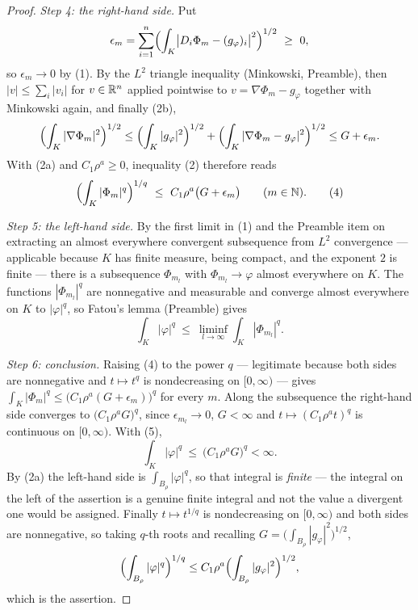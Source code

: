 \begin{proof}
\emph{Step 4: the right-hand side.}  Put
\[
\epsilon_m=\sum_{i=1}^n
\Bigl(\int_K\bigl|D_i\Phi_m-(g_\varphi)_i\bigr|^{2}\Bigr)^{1/2}\ \ge\ 0 ,
\]
so $\epsilon_m\to0$ by (1).  By the $L^2$ triangle inequality (Minkowski,
Preamble), then $|v|\le\sum_i|v_i|$ for $v\in\mathbb{R}^n$ applied pointwise to
$v=\nabla\Phi_m-g_\varphi$ together with Minkowski again, and finally (2b),
\[
\Bigl(\int_K|\nabla\Phi_m|^{2}\Bigr)^{1/2}
\le\Bigl(\int_K|g_\varphi|^{2}\Bigr)^{1/2}
+\Bigl(\int_K|\nabla\Phi_m-g_\varphi|^{2}\Bigr)^{1/2}
\le G+\epsilon_m .
\]
With (2a) and $C_1\rho^{a}\ge0$, inequality (2) therefore reads
\[
\Bigl(\int_K|\Phi_m|^{q}\Bigr)^{1/q}
\ \le\ C_1\rho^{a}\bigl(G+\epsilon_m\bigr)
\qquad(m\in\mathbb{N}).
\tag{4}
\]

\emph{Step 5: the left-hand side.}  By the first limit in (1) and the Preamble
item on extracting an almost everywhere convergent subsequence from $L^2$
convergence --- applicable because $K$ has finite measure, being compact, and
the exponent $2$ is finite --- there is a subsequence $\Phi_{m_l}$ with
$\Phi_{m_l}\to\varphi$ almost everywhere on $K$.  The functions
$|\Phi_{m_l}|^{q}$ are nonnegative and measurable and converge almost
everywhere on $K$ to $|\varphi|^{q}$, so Fatou's lemma (Preamble) gives
\[
\int_K|\varphi|^{q}\ \le\ \liminf_{l\to\infty}\int_K|\Phi_{m_l}|^{q} .
\tag{5}
\]

\emph{Step 6: conclusion.}  Raising (4) to the power $q$ --- legitimate because
both sides are nonnegative and $t\mapsto t^{q}$ is nondecreasing on
$[0,\infty)$ --- gives
$\int_K|\Phi_{m}|^{q}\le\bigl(C_1\rho^{a}(G+\epsilon_m)\bigr)^{q}$ for every
$m$.  Along the subsequence the right-hand side converges to
$\bigl(C_1\rho^{a}G\bigr)^{q}$, since $\epsilon_{m_l}\to0$, $G<\infty$ and
$t\mapsto(C_1\rho^{a}t)^q$ is continuous on $[0,\infty)$.  With (5),
\[
\int_K|\varphi|^{q}\ \le\ \bigl(C_1\rho^{a}G\bigr)^{q}<\infty .
\]
By (2a) the left-hand side is $\int_{B_\rho}|\varphi|^{q}$, so that integral is
\emph{finite} --- the integral on the left of the assertion is a genuine finite
integral and not the value a divergent one would be assigned.  Finally
$t\mapsto t^{1/q}$ is nondecreasing on $[0,\infty)$ and both sides are
nonnegative, so taking $q$-th roots and recalling
$G=\bigl(\int_{B_\rho}|g_\varphi|^2\bigr)^{1/2}$,
\[
\Bigl(\int_{B_\rho}|\varphi|^{q}\Bigr)^{1/q}
\le C_1\rho^{a}\Bigl(\int_{B_\rho}|g_\varphi|^2\Bigr)^{1/2},
\]
which is the assertion.
\end{proof}
